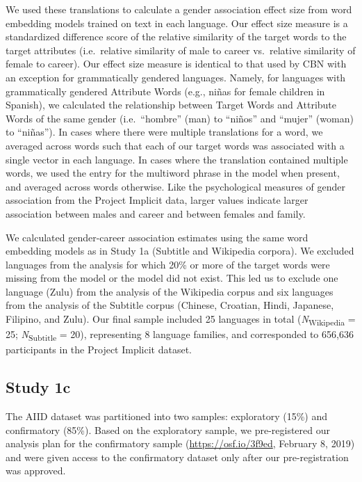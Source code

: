 \documentclass[11pt]{wlscirep}
\begin{document}
We used these translations to calculate a gender association effect size from
word embedding models trained on text in each language. Our effect size
measure is a standardized difference score of the relative similarity of
the target words to the target attributes (i.e.~relative similarity of
male to career vs.~relative similarity of female to career). Our effect
size measure is identical to that used by CBN with an exception for
grammatically gendered languages. Namely, for languages with grammatically gendered Attribute
Words (e.g., niñas for female children in Spanish), we calculated the
relationship between Target Words and Attribute Words of the same gender
(i.e.~\enquote{hombre} (man) to \enquote{niños} and \enquote{mujer}
(woman) to \enquote{niñas}). In cases where there were multiple
translations for a word, we averaged across words such that each of our
target words was associated with a single vector in each language. In
cases where the translation contained multiple words, we used the entry
for the multiword phrase in the model when present, and averaged across
words otherwise. Like the psychological measures of gender association from the
Project Implicit data, larger values indicate larger association between males and career and between females and family.

We calculated gender-career association estimates using the same word embedding models
as in Study 1a (Subtitle and Wikipedia corpora). We excluded languages
from the analysis for which 20\% or more of the target words were
missing from the model or the model did not exist. This led us to
exclude one language (Zulu) from the analysis of the Wikipedia corpus
and six languages from the analysis of the Subtitle corpus (Chinese,
Croatian, Hindi, Japanese, Filipino, and Zulu). Our final sample
included 25 languages in total (\emph{N}\textsubscript{Wikipedia} = 25;
\emph{N}\textsubscript{Subtitle} = 20), representing 8 language
families, and corresponded to 656,636  participants in the Project Implicit dataset.


\subsection*{Study 1c}

The AIID dataset was partitioned into two samples: exploratory (15\%) and
confirmatory (85\%). Based on the exploratory sample, we pre-registered
our analysis plan for the confirmatory sample
(\url{https://osf.io/3f9ed}, February 8, 2019) and were given access to the confirmatory dataset only after our pre-registration was approved. 
\end{document}
